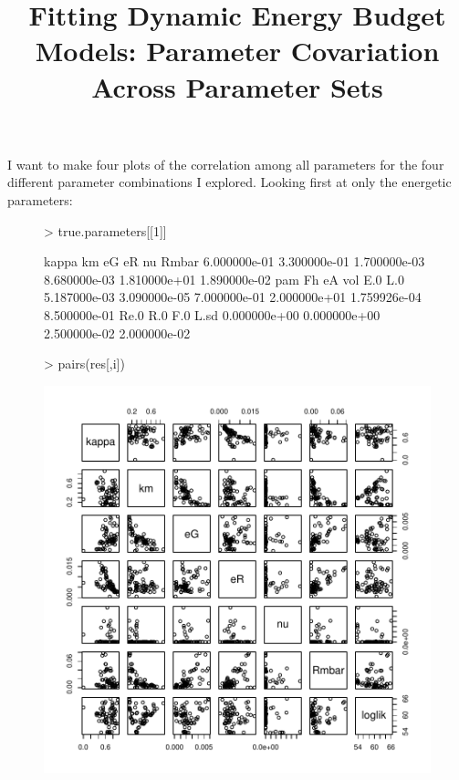 \documentclass[12pt,reqno,final]{amsart}
\title[DEB fitting notes]{Fitting Dynamic Energy Budget Models:
  Parameter Covariation Across Parameter Sets}
\theoremstyle{plain}
\numberwithin{equation}{part}
\begin{document}
\maketitle

I want to make four plots of the correlation among all parameters for
the four different parameter combinations I explored. Looking first at
only the energetic parameters:


\begin{figure}
\begin{Schunk}
\begin{Sinput}
> true.parameters[[1]]
\end{Sinput}
\begin{Soutput}
       kappa           km           eG           eR           nu        Rmbar 
6.000000e-01 3.300000e-01 1.700000e-03 8.680000e-03 1.810000e+01 1.890000e-02 
         pam           Fh           eA          vol          E.0          L.0 
5.187000e-03 3.090000e-05 7.000000e-01 2.000000e+01 1.759926e-04 8.500000e-01 
        Re.0          R.0          F.0         L.sd 
0.000000e+00 0.000000e+00 2.500000e-02 2.000000e-02 
\end{Soutput}
\begin{Sinput}
> pairs(res[,i])
\end{Sinput}
\end{Schunk}
\includegraphics{Correlation_among_parameters-002}
\end{figure}
\end{document}
